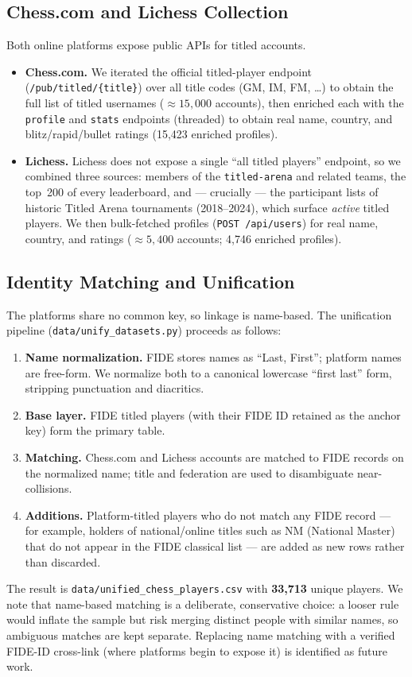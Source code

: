 \documentclass[11pt,a4paper]{article}
\begin{document}
\subsection{Chess.com and Lichess Collection}
Both online platforms expose public APIs for titled accounts.
\begin{itemize}
  \item \textbf{Chess.com.} We iterated the official titled-player endpoint
  (\texttt{/pub/titled/\{title\}}) over all title codes (GM, IM, FM, \dots) to obtain the
  full list of titled usernames ($\approx 15{,}000$ accounts), then enriched each with the
  \texttt{profile} and \texttt{stats} endpoints (threaded) to obtain real name, country, and
  blitz/rapid/bullet ratings (15{,}423 enriched profiles).
  \item \textbf{Lichess.} Lichess does not expose a single ``all titled players'' endpoint,
  so we combined three sources: members of the \texttt{titled-arena} and related teams, the
  top~200 of every leaderboard, and --- crucially --- the participant lists of historic Titled
  Arena tournaments (2018--2024), which surface \emph{active} titled players. We then
  bulk-fetched profiles (\texttt{POST /api/users}) for real name, country, and ratings
  ($\approx 5{,}400$ accounts; 4{,}746 enriched profiles).
\end{itemize}

\subsection{Identity Matching and Unification}
\label{sec:matching}
The platforms share no common key, so linkage is name-based. The unification pipeline
(\texttt{data/unify\_datasets.py}) proceeds as follows:
\begin{enumerate}
  \item \textbf{Name normalization.} FIDE stores names as ``Last, First''; platform names are
  free-form. We normalize both to a canonical lowercase ``first last'' form, stripping
  punctuation and diacritics.
  \item \textbf{Base layer.} FIDE titled players (with their FIDE ID retained as the anchor
  key) form the primary table.
  \item \textbf{Matching.} Chess.com and Lichess accounts are matched to FIDE records on the
  normalized name; title and federation are used to disambiguate near-collisions.
  \item \textbf{Additions.} Platform-titled players who do not match any FIDE record --- for
  example, holders of national/online titles such as NM (National Master) that do not appear
  in the FIDE classical list --- are added as new rows rather than discarded.
\end{enumerate}
The result is \texttt{data/unified\_chess\_players.csv} with \textbf{33{,}713} unique
players. We note that name-based matching is a deliberate, conservative choice: a looser rule
would inflate the sample but risk merging distinct people with similar names, so ambiguous
matches are kept separate. Replacing name matching with a verified FIDE-ID cross-link (where
platforms begin to expose it) is identified as future work.
\end{document}
